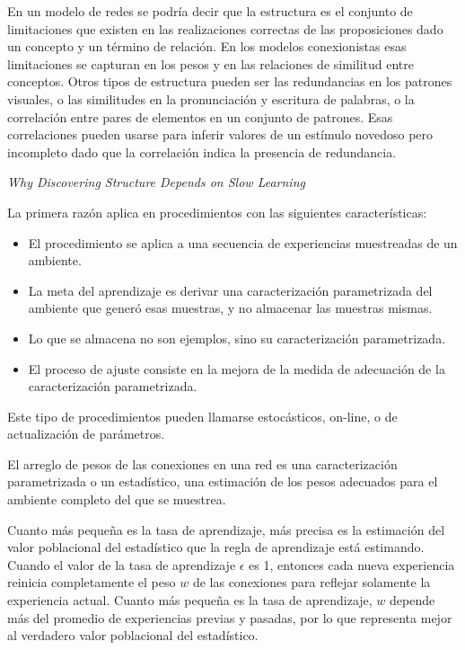 \documentclass[a4paper,12pt]{article}
\begin{document}
En un modelo de redes se podría decir que la estructura es el conjunto de limitaciones que existen en las realizaciones correctas de las proposiciones dado un concepto y un término de relación. En los modelos conexionistas esas limitaciones se capturan en los pesos y en las relaciones de similitud entre conceptos. Otros tipos de estructura pueden ser las redundancias en los patrones visuales, o las similitudes en la pronunciación y escritura de palabras, o la correlación entre pares de elementos en un conjunto de patrones. Esas correlaciones pueden usarse para inferir valores de un estímulo novedoso pero incompleto dado que la correlación indica la presencia de redundancia.

{\itshape Why Discovering Structure Depends on Slow Learning}

La primera razón aplica en procedimientos con las siguientes características:
\begin{itemize}
	\item El procedimiento se aplica a una secuencia de experiencias muestreadas de un ambiente.
	\item La meta del aprendizaje es derivar una caracterización parametrizada del ambiente que generó esas muestras, y no almacenar las muestras mismas.
	\item Lo que se almacena no son ejemplos, sino su caracterización parametrizada.
	\item El proceso de ajuste consiste en la mejora de la medida de adecuación de la caracterización parametrizada.
\end{itemize}

Este tipo de procedimientos pueden llamarse estocásticos, on-line, o de actualización de parámetros.

El arreglo de pesos de las conexiones en una red es una caracterización parametrizada o un estadístico, una estimación de los pesos adecuados para el ambiente completo del que se muestrea.

Cuanto más pequeña es la tasa de aprendizaje, más precisa es la estimación del valor poblacional del estadístico que la regla de aprendizaje está estimando. Cuando el valor de la tasa de aprendizaje $\epsilon$ es 1, entonces cada nueva experiencia reinicia completamente el peso $w$ de las conexiones para reflejar solamente la experiencia actual. Cuanto más pequeña es la tasa de aprendizaje, $w$ depende más del promedio de experiencias previas y pasadas, por lo que representa mejor al verdadero valor poblacional del estadístico.
\end{document}
